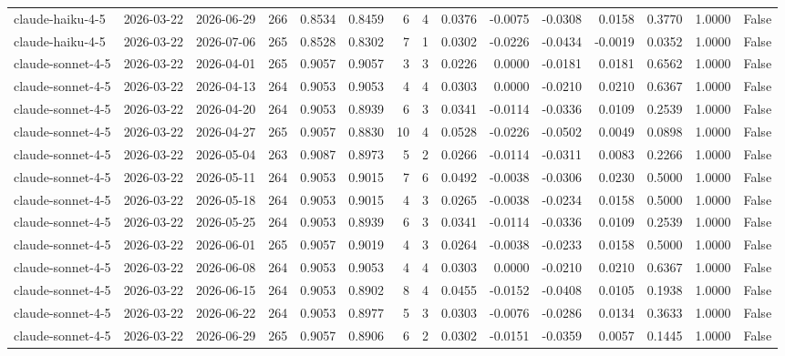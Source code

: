 \begin{table}
\begin{tabular}{lllrrrrrrrrrrrr}
claude-haiku-4-5 & 2026-03-22 & 2026-06-29 & 266 & 0.8534 & 0.8459 & 6 & 4 & 0.0376 & -0.0075 & -0.0308 & 0.0158 & 0.3770 & 1.0000 & False \\
claude-haiku-4-5 & 2026-03-22 & 2026-07-06 & 265 & 0.8528 & 0.8302 & 7 & 1 & 0.0302 & -0.0226 & -0.0434 & -0.0019 & 0.0352 & 1.0000 & False \\
claude-sonnet-4-5 & 2026-03-22 & 2026-04-01 & 265 & 0.9057 & 0.9057 & 3 & 3 & 0.0226 & 0.0000 & -0.0181 & 0.0181 & 0.6562 & 1.0000 & False \\
claude-sonnet-4-5 & 2026-03-22 & 2026-04-13 & 264 & 0.9053 & 0.9053 & 4 & 4 & 0.0303 & 0.0000 & -0.0210 & 0.0210 & 0.6367 & 1.0000 & False \\
claude-sonnet-4-5 & 2026-03-22 & 2026-04-20 & 264 & 0.9053 & 0.8939 & 6 & 3 & 0.0341 & -0.0114 & -0.0336 & 0.0109 & 0.2539 & 1.0000 & False \\
claude-sonnet-4-5 & 2026-03-22 & 2026-04-27 & 265 & 0.9057 & 0.8830 & 10 & 4 & 0.0528 & -0.0226 & -0.0502 & 0.0049 & 0.0898 & 1.0000 & False \\
claude-sonnet-4-5 & 2026-03-22 & 2026-05-04 & 263 & 0.9087 & 0.8973 & 5 & 2 & 0.0266 & -0.0114 & -0.0311 & 0.0083 & 0.2266 & 1.0000 & False \\
claude-sonnet-4-5 & 2026-03-22 & 2026-05-11 & 264 & 0.9053 & 0.9015 & 7 & 6 & 0.0492 & -0.0038 & -0.0306 & 0.0230 & 0.5000 & 1.0000 & False \\
claude-sonnet-4-5 & 2026-03-22 & 2026-05-18 & 264 & 0.9053 & 0.9015 & 4 & 3 & 0.0265 & -0.0038 & -0.0234 & 0.0158 & 0.5000 & 1.0000 & False \\
claude-sonnet-4-5 & 2026-03-22 & 2026-05-25 & 264 & 0.9053 & 0.8939 & 6 & 3 & 0.0341 & -0.0114 & -0.0336 & 0.0109 & 0.2539 & 1.0000 & False \\
claude-sonnet-4-5 & 2026-03-22 & 2026-06-01 & 265 & 0.9057 & 0.9019 & 4 & 3 & 0.0264 & -0.0038 & -0.0233 & 0.0158 & 0.5000 & 1.0000 & False \\
claude-sonnet-4-5 & 2026-03-22 & 2026-06-08 & 264 & 0.9053 & 0.9053 & 4 & 4 & 0.0303 & 0.0000 & -0.0210 & 0.0210 & 0.6367 & 1.0000 & False \\
claude-sonnet-4-5 & 2026-03-22 & 2026-06-15 & 264 & 0.9053 & 0.8902 & 8 & 4 & 0.0455 & -0.0152 & -0.0408 & 0.0105 & 0.1938 & 1.0000 & False \\
claude-sonnet-4-5 & 2026-03-22 & 2026-06-22 & 264 & 0.9053 & 0.8977 & 5 & 3 & 0.0303 & -0.0076 & -0.0286 & 0.0134 & 0.3633 & 1.0000 & False \\
claude-sonnet-4-5 & 2026-03-22 & 2026-06-29 & 265 & 0.9057 & 0.8906 & 6 & 2 & 0.0302 & -0.0151 & -0.0359 & 0.0057 & 0.1445 & 1.0000 & False \\

\end{tabular}
\end{table}
